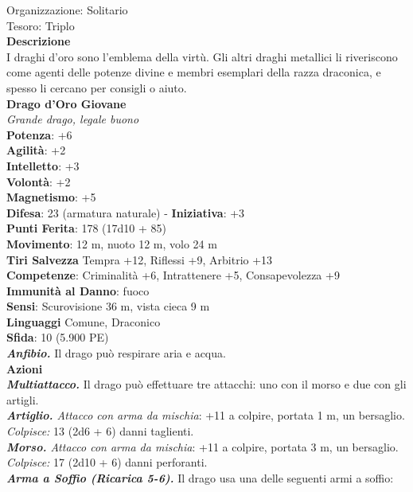 \begin{multicols}{2}
Organizzazione: Solitario\\
Tesoro: Triplo\\
\textbf{Descrizione}\\
I draghi d'oro sono l'emblema della virtù. Gli altri draghi metallici li riveriscono come agenti delle potenze divine e membri esemplari della razza draconica, e spesso li cercano per consigli o aiuto.\\
\medskip\textbf{Drago d'Oro Giovane}\\
\emph{Grande drago, legale buono}\\
\textbf{Potenza}: +6\\
\textbf{Agilità}: +2\\
\textbf{Intelletto}: +3\\
\textbf{Volontà}: +2\\
\textbf{Magnetismo}: +5\\
\textbf{Difesa}: 23 (armatura naturale) - \textbf{Iniziativa}: +3\\
\textbf{Punti Ferita}: 178 (17d10 + 85)\\
\textbf{Movimento}: 12 m, nuoto 12 m, volo 24 m\\
\textbf{Tiri Salvezza} Tempra +12, Riflessi +9, Arbitrio +13\\
\textbf{Competenze}: Criminalità +6, Intrattenere +5, Consapevolezza +9 \\
\textbf{Immunità al Danno}: fuoco\\
\textbf{Sensi}: Scurovisione 36 m, vista cieca 9 m\\
\textbf{Linguaggi} Comune, Draconico\\
\textbf{Sfida}: 10 (5.900 PE)\smallskip\\
\emph{\textbf{Anfibio.}} Il drago può respirare aria e acqua.\\
\smallskip\textbf{Azioni}\\
\emph{\textbf{Multiattacco.}} Il drago può effettuare tre attacchi: uno con il morso e due con gli artigli.\\
\emph{\textbf{Artiglio.} Attacco con arma da mischia}: +11 a colpire, portata 1 m, un bersaglio.\\
\emph{Colpisce:} 13 (2d6 + 6) danni taglienti.\\
\emph{\textbf{Morso.} Attacco con arma da mischia}: +11 a colpire, portata 3 m, un bersaglio.\\
\emph{Colpisce:} 17 (2d10 + 6) danni perforanti.\\
\emph{\textbf{Arma a Soffio (Ricarica 5-6).}} Il drago usa una delle seguenti armi a soffio:\\

\end{multicols}
